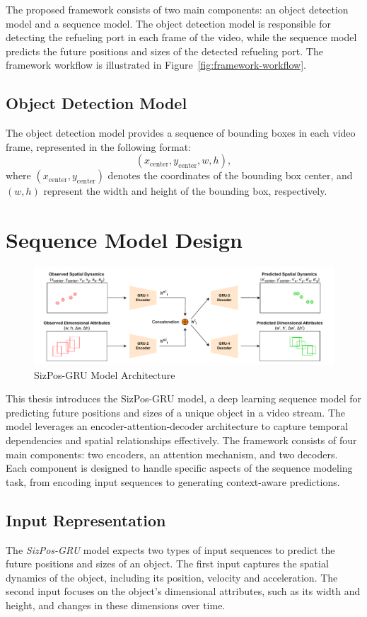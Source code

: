 \documentclass[12pt,oneside]{book} %
\begin{document}
The proposed framework consists of two main components: an object detection
model and a sequence model. The object detection model is responsible for
detecting the refueling port in each frame of the video, while the sequence
model predicts the future positions and sizes of the detected refueling port.
The framework workflow is illustrated in Figure~\ref{fig:framework-workflow}. 

\subsection{Object Detection Model}
The object detection model provides a sequence of bounding boxes in each video
frame, represented in the following format:
\[
    (x_{\text{center}}, y_{\text{center}}, w, h),
\]
where $(x_{\text{center}}, y_{\text{center}})$ denotes the coordinates of the
bounding box center, and $(w, h)$ represent the width and height of the
bounding box, respectively.

\section{Sequence Model Design}

\begin{figure}[H]
    \centering
    \includegraphics[width=1\textwidth]{figures/GRUSizPos.drawio.pdf}
    \caption{SizPos-GRU Model Architecture}\label{fig:sizpos-gru}
\end{figure}

This thesis introduces the SizPos-GRU model, a deep learning sequence model for
predicting future positions and sizes of a unique object in a video stream. The
model leverages an encoder-attention-decoder architecture to capture temporal
dependencies and spatial relationships effectively. The framework consists of
four main components: two encoders, an attention mechanism, and two decoders.
Each component is designed to handle specific aspects of the sequence modeling
task, from encoding input sequences to generating context-aware predictions.

\subsection{Input Representation}
The \textit{SizPos-GRU} model expects two types of input sequences to predict
the future positions and sizes of an object. The first input captures the
spatial dynamics of the object, including its position, velocity and
acceleration. The second input focuses on the object's dimensional attributes,
such as its width and height, and changes in these dimensions over time.
\end{document}
